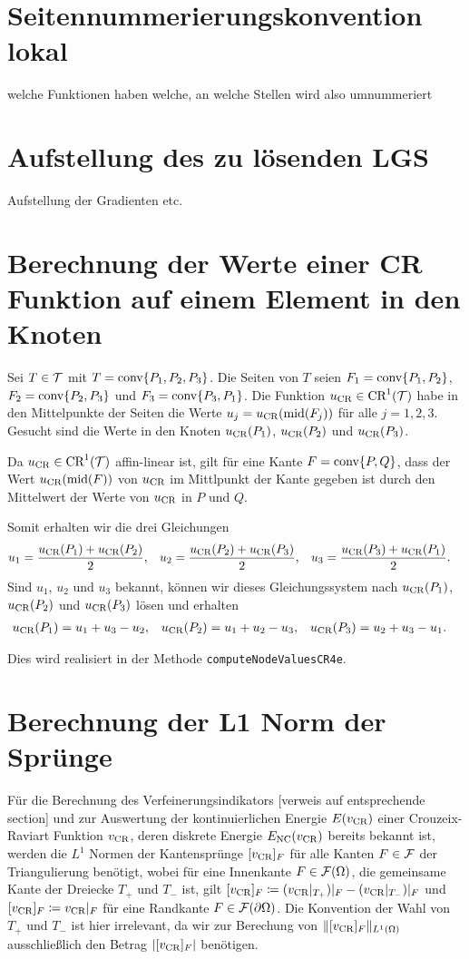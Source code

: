 





\section{Seitennummerierungskonvention lokal}
welche Funktionen haben welche, an 
welche Stellen wird also umnummeriert

\section{Aufstellung des zu lösenden LGS}
Aufstellung der Gradienten etc.
 
\section{Berechnung der Werte einer CR Funktion auf einem Element in den Knoten}
Sei $T\in\mathcal{T}$ mit $T = \textup{conv}\{P_1, P_2, P_3\}$. Die Seiten 
von $T$ seien $F_1 = \textup{conv}\{P_1,P_2\}$, $F_2 = \textup{conv}\{P_2,P_3\}$ und $F_3 =
\textup{conv}\{P_3,P_1\}$. Die Funktion
$u_\textup{CR}\in\textup{CR}^1(\mathcal{T})$ habe in den Mittelpunkte der Seiten die Werte $u_j =
u_\textup{CR}(\textup{mid}(F_j))$ für alle $j=1,2,3$. Gesucht sind die Werte in den Knoten
$u_\textup{CR}(P_1)$, $u_\textup{CR}(P_2)$ und $u_\textup{CR}(P_3)$.

Da $u_\textup{CR}\in\textup{CR}^1(\mathcal{T})$ affin-linear ist, gilt für eine Kante
$F=\textup{conv}\{P,Q\}$, dass der Wert $u_\textup{CR}(\textup{mid}(F))$ von $u_\textup{CR}$ im Mittlpunkt 
der Kante gegeben ist durch den Mittelwert der Werte von $u_\textup{CR}$ in $P$ und $Q$.

Somit erhalten wir die drei Gleichungen
\begin{align*}
  u_1 &= \frac{u_\textup{CR}(P_1)+u_\textup{CR}(P_2)}{2},  
  &u_2 &= \frac{u_\textup{CR}(P_2)+u_\textup{CR}(P_3)}{2},  
  &u_3 &= \frac{u_\textup{CR}(P_3)+u_\textup{CR}(P_1)}{2}.
\end{align*}
Sind $u_1$, $u_2$ und $u_3$ bekannt, können wir dieses Gleichungssystem nach 
$u_\textup{CR}(P_1)$, $u_\textup{CR}(P_2)$ und $u_\textup{CR}(P_3)$ lösen und erhalten
\begin{align*}
 u_\textup{CR}(P_1)&=u_1+u_3-u_2, &u_\textup{CR}(P_2)&= u_1+u_2-u_3,&u_\textup{CR}(P_3)&=u_2+u_3-u_1.
\end{align*}

Dies wird realisiert in der Methode \texttt{computeNodeValuesCR4e}.

\section{Berechnung der L1 Norm der Sprünge}
Für die Berechnung des Verfeinerungsindikators [verweis auf entsprechende
section] und zur Auswertung der kontinuierlichen Energie $E(v_\textup{CR})$ einer 
Crouzeix-Raviart Funktion $v_\textup{CR}$, deren diskrete Energie $E_\textup{NC}(v_\textup{CR})$
bereits bekannt ist, werden die $L^1$ Normen der Kantensprünge 
$[v_\textup{CR}]_F$ für alle Kanten $F\in\mathcal{F}$ der Triangulierung benötigt,
wobei für eine Innenkante $F\in\mathcal{F}(\Omega)$, die gemeinsame Kante der
Dreiecke $T_+$ und $T_-$ ist, gilt
$[v_\textup{CR}]_F\coloneqq (v_\textup{CR}|_{T_+})|_F-(v_\textup{CR}|_{T_-})|_F$
und $[v_\textup{CR}]_F \coloneqq v_\textup{CR}|_F$ für eine Randkante
$F\in\mathcal{F}(\partial\Omega)$. Die Konvention der Wahl von
$T_+$ und $T_-$ ist hier irrelevant, da wir
zur Berechung von $\Vert [v_\textup{CR}]_F\Vert_{L^1(\Omega)}$
ausschließlich den Betrag $|[v_\textup{CR}]_F|$ benötigen.

